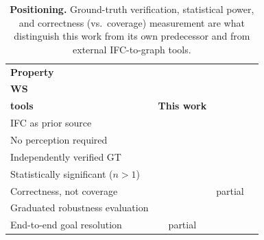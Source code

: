 \documentclass[a4paper, 10pt, conference]{ieeeconf}
\newcommand{\cmark}{\ding{51}}
\newcommand{\xmark}{\ding{55}}
\begin{document}
\begin{table}[t]
\centering
\caption{\textbf{Positioning.} Ground-truth verification, statistical power, and correctness (vs.\ coverage) measurement are what distinguish this work from its own predecessor and from external IFC-to-graph tools.}
\label{tab:positioning}
\footnotesize
\setlength{\tabcolsep}{3pt}
\begin{tabularx}{\columnwidth}{@{}X c c c@{}}
\toprule
\textbf{Property} & \makecell{\textbf{RoboBIM}\\\textbf{WS \cite{nedungadi2026robobimws}}} & \makecell{\textbf{External}\\\textbf{tools}} & \textbf{This work} \\
\midrule
IFC as prior source              & \cmark & \cmark & \cmark \\
No perception required           & \cmark & \cmark & \cmark \\
Independently verified GT        & \xmark & \xmark & \cmark \\
Statistically significant ($n{>}1$) & \xmark & \xmark & \cmark \\
Correctness, not coverage        & \xmark & partial & \cmark \\
Graduated robustness evaluation  & \xmark & \xmark & \cmark \\
End-to-end goal resolution       & partial & \xmark & \cmark \\
\bottomrule
\end{tabularx}
\end{table}


{\footnotesize
}
\end{document}
